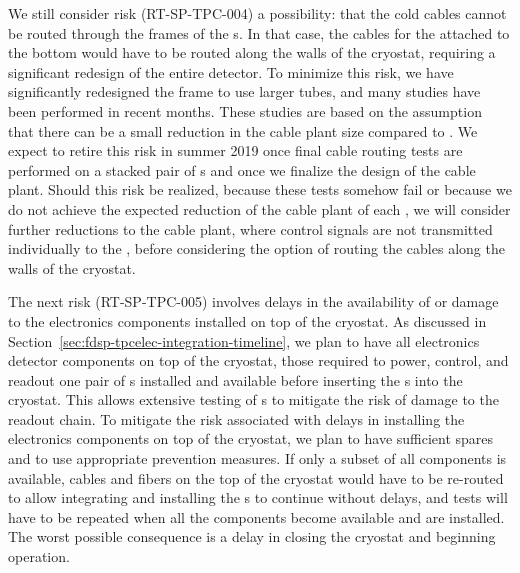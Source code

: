 We still consider risk (RT-SP-TPC-004) a possibility: that the cold cables cannot
be routed through the frames of the s. In that case, the cables for the
 attached to the bottom  would have to be routed along the
walls of the cryostat, requiring a significant redesign of the entire detector. 
To minimize this risk, we have significantly redesigned the  frame 
to use larger tubes, and many studies have been performed in recent months.
These studies are based on the assumption that there can be a small reduction in
the cable plant size compared to . We expect to retire this risk
in summer 2019 once final cable routing tests are performed on
a stacked pair of s and once we finalize the design of the
 cable plant. Should
this risk be realized, because these tests somehow fail or because we do not 
achieve the expected reduction of the cable plant of each , we will 
consider further reductions to the cable plant, where control signals are not
transmitted individually to the , before considering the option of 
routing the cables along the walls of the cryostat.

The next risk (RT-SP-TPC-005) involves delays in the availability of or
damage to the  electronics components installed on top of the
cryostat. As discussed in Section~\ref{sec:fdsp-tpcelec-integration-timeline},
we plan to have all  electronics detector components on top of the cryostat, those 
required to power, control, and readout one pair of s installed
and available before inserting the s into the cryostat.
This allows extensive testing of s to mitigate
the risk of damage to the readout chain. To mitigate the risk associated with
delays in installing the  electronics components on top of the cryostat,
we plan to have sufficient spares and to use appropriate  
prevention measures. If only a subset of all components is available, cables 
and fibers on the top of the cryostat would have to be re-routed to allow  
integrating and installing the s to continue without delays, 
and tests will have to be repeated when all the components become available 
and are installed. The worst possible consequence is a delay in closing 
the cryostat and beginning operation. 

